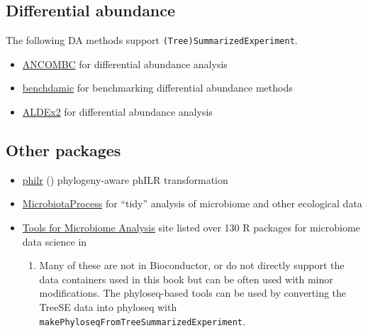\documentclass[
]{book}
\providecommand{\tightlist}{%
  \setlength{\itemsep}{0pt}\setlength{\parskip}{0pt}}
\begin{document}
\hypertarget{sub-diff-abund}{%
\subsection{Differential abundance}\label{sub-diff-abund}}

The following DA methods support \texttt{(Tree)SummarizedExperiment}.

\begin{itemize}
\tightlist
\item
  \href{https://bioconductor.org/packages/devel/bioc/html/ANCOMBC.html}{ANCOMBC} for differential abundance analysis
\item
  \href{https://bioconductor.org/packages/release/bioc/vignettes/benchdamic/inst/doc/intro.html}{benchdamic} for benchmarking differential abundance methods
\item
  \href{https://www.bioconductor.org/packages/release/bioc/html/ALDEx2.html}{ALDEx2} for differential abundance analysis
\end{itemize}

\hypertarget{other-packages}{%
\subsection{Other packages}\label{other-packages}}

\begin{itemize}
\tightlist
\item
  \href{http://bioconductor.org/packages/devel/bioc/html/philr.html}{philr} (\citet{Silverman2017}) phylogeny-aware phILR transformation
\item
  \href{https://bioconductor.org/packages/release/bioc/html/MicrobiotaProcess.html}{MicrobiotaProcess} for ``tidy'' analysis of microbiome and other ecological data
\item
  \href{https://microsud.github.io/Tools-Microbiome-Analysis/}{Tools for Microbiome
  Analysis}
  site listed over 130 R packages for microbiome data science in

  \begin{enumerate}
  \def\labelenumi{\arabic{enumi}.}
  \setcounter{enumi}{2022}
  \tightlist
  \item
    Many of these are not in Bioconductor, or do not directly
    support the data containers used in this book but can be often used
    with minor modifications. The phyloseq-based tools can be used by
    converting the TreeSE data into phyloseq with
    \texttt{makePhyloseqFromTreeSummarizedExperiment}.
  \end{enumerate}
\end{itemize}
\end{document}
